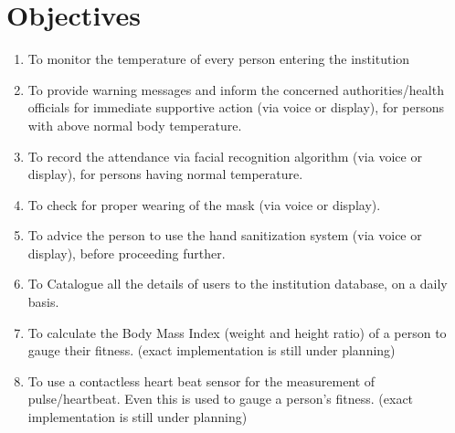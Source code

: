 \section{Objectives}
\begin{enumerate}
	\item 	To monitor the temperature of every person entering the institution  \par 
	\item 	To provide warning messages and inform the concerned authorities/health officials for immediate supportive action (via voice or display), for persons with above normal body temperature.\par 
	\item 	To record the attendance via facial recognition algorithm (via voice or display), for persons having normal temperature.\par
	\item 	To check for proper wearing of the mask (via voice or display). \par 
    \item 	To advice the person to use the hand sanitization system (via voice or display), before proceeding further. \par
\item 	To Catalogue all the details of users to the institution database, on a daily basis.\par
\item 	To calculate the Body Mass Index (weight and height ratio) of a person to gauge their fitness. (exact implementation is still under planning)  \par
\item	To use a contactless heart beat sensor for the measurement of pulse/heartbeat. Even this is used to gauge a person’s fitness. (exact implementation is still under planning) \par
\end{enumerate}

